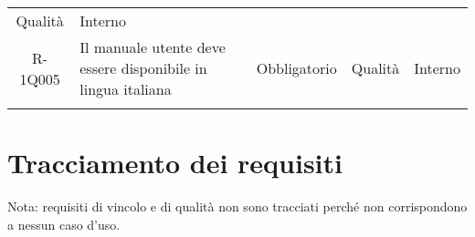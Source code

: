 \begin{tabularx}{\textwidth}{cXccc}
	Qualità &
	
	Interno \\
	R-1Q005 &
	
	Il manuale utente deve essere disponibile in lingua italiana   &
	
	Obbligatorio &
	
	Qualità &
	
	Interno \\
	
	\rowcolor{white}
	\caption{Tabella requisiti di qualità} \label{tab:tabellarequisitiqualità}
\end{tabularx}


\section{Tracciamento dei requisiti}
Nota: requisiti di vincolo e di qualità non sono tracciati perché non corrispondono a nessun caso d'uso.
